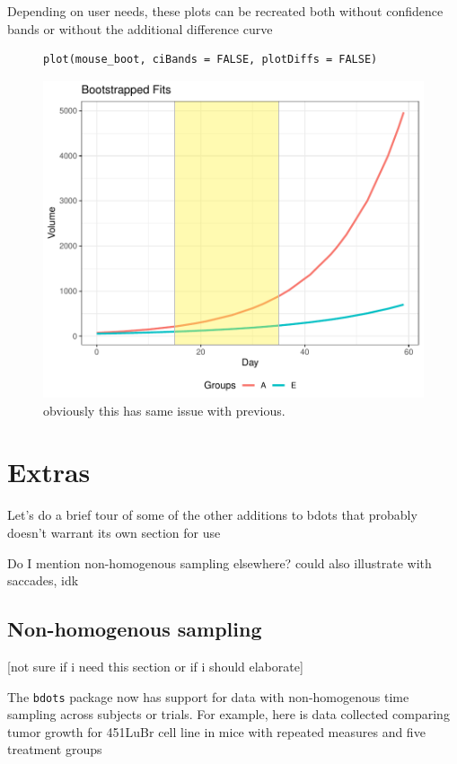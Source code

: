 \documentclass{article}
\begin{document}
Depending on user needs, these plots can be recreated both without confidence bands or without the additional difference curve

\begin{figure}[h]
\centering
\begin{BVerbatim}
plot(mouse_boot, ciBands = FALSE, plotDiffs = FALSE)
\end{BVerbatim}


\includegraphics{img/mouse_boot_plot_extra.pdf}
\caption{obviously this has same issue with previous.}
\end{figure}


\section{Extras}

Let's do a brief tour of some of the other additions to bdots that probably doesn't warrant its own section for use

Do I mention non-homogenous sampling elsewhere? could also illustrate with saccades, idk

\subsection{Non-homogenous sampling}

[not sure if i need this section or if i should elaborate]

The \texttt{bdots} package now has support for data with non-homogenous time sampling across subjects or trials. For example, here is data collected comparing tumor growth for 451LuBr cell line in mice with repeated measures and five treatment groups
\end{document}
